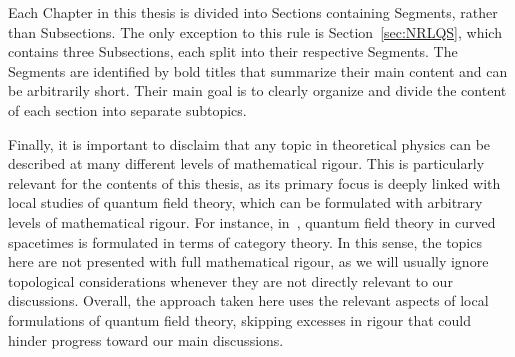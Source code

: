 Each Chapter in this thesis is divided into Sections containing Segments, rather than Subsections. The only exception to this rule is Section~\ref{sec:NRLQS}, which contains three Subsections, each split into their respective Segments. The Segments are identified by bold titles that summarize their main content and can be arbitrarily short. Their main goal is to clearly organize and divide the content of each section into separate subtopics. 

Finally, it is important to disclaim that any topic in theoretical physics can be described at many different levels of mathematical rigour. This is particularly relevant for the contents of this thesis, as its primary focus is deeply linked with local studies of quantum field theory, which can be formulated with arbitrary levels of mathematical rigour. For instance, in~\cite{FewsterCategory}, quantum field theory in curved spacetimes is formulated in terms of category theory. In this sense, the topics here are not presented with full mathematical rigour, as we will usually ignore topological considerations whenever they are not directly relevant to our discussions. Overall, the approach taken here uses the relevant aspects of local formulations of quantum field theory, skipping excesses in rigour that could hinder progress toward our main discussions.





